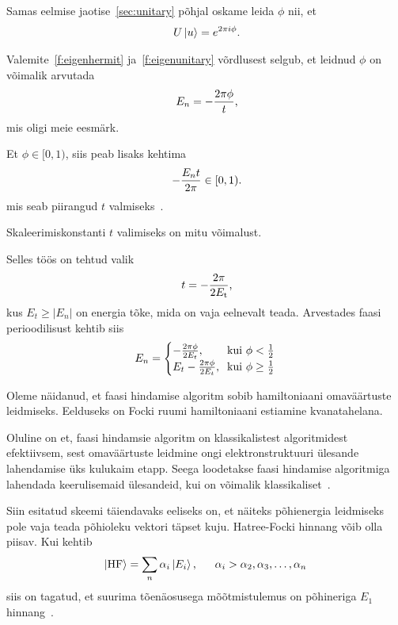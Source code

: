 \documentclass[12pt]{report}
\def\abs#1{\left|#1\right|}
\def\ket#1{\mathinner{|#1\rangle}}
\begin{document}
Samas eelmise jaotise~\ref{sec:unitary} põhjal oskame leida \(\phi\) nii, et
\begin{align}\label{f:eigenunitary}
    U \ket{u} = e^{2\pi i\phi} \rlap{.}
\end{align}

Valemite~\ref{f:eigenhermit} ja~\ref{f:eigenunitary} võrdlusest selgub, et leidnud \(\phi\) on võimalik arvutada
\begin{align}
    E_n = -\frac{2\pi\phi}{t} \rlap{,}
\end{align}
mis oligi meie eesmärk.

Et \(\phi \in [0, 1)\), siis peab lisaks kehtima
\begin{align}
    -\frac{E_n t}{2\pi} \in [0, 1) \rlap{.}
\end{align}
mis seab piirangud \(t\) valmiseks~\cite{whitfield+etal}.

Skaleerimiskonstanti \(t\) valimiseks on mitu võimalust.

Selles töös on tehtud valik
\begin{align}
    t = -\frac{2\pi}{2E_\mathrm{t}} \rlap{,}
\end{align}
kus \(E_t \ge \abs{E_n}\) on energia tõke, mida on vaja eelnevalt teada.
Arvestades faasi perioodilisust kehtib siis
\begin{align}
    E_n = \begin{cases}
        -\frac{2\pi\phi}{2E_t}\rlap{,} & \text{kui } \phi < \frac{1}{2} \\
        E_t - \frac{2\pi\phi}{2E_t}\rlap{,} & \text{kui } \phi \ge \frac{1}{2} \\
    \end{cases}
\end{align}

Oleme näidanud, et faasi hindamise algoritm sobib hamiltoniaani omaväärtuste leidmiseks.
Eelduseks on Focki ruumi hamiltoniaani estiamine kvanatahelana.

Oluline on et, faasi hindamsie algoritm on klassikalistest algoritmidest efektiivsem, sest omaväärtuste leidmine ongi elektronstruktuuri ülesande lahendamise üks kulukaim etapp.
Seega loodetakse faasi hindamise algoritmiga lahendada keerulisemaid ülesandeid, kui on võimalik klassikaliset~\cite{mcardle+etal, cao+etal}.

Siin esitatud skeemi täiendavaks eeliseks on, et näiteks põhienergia leidmiseks pole vaja teada põhioleku vektori täpset kuju.
Hatree-Focki hinnang võib olla piisav.
Kui kehtib
\begin{align}
    \ket{\text{HF}} = \sum_n \alpha_i \ket{E_i} \rlap{,}
    \qquad \alpha_i > \alpha_2, \alpha_3, \ldots, \alpha_n
\end{align}
siis on tagatud, et suurima tõenäosusega mõõtmistulemus on põhineriga \(E_1\) hinnang~\cite{whitfield+etal}.
\end{document}
